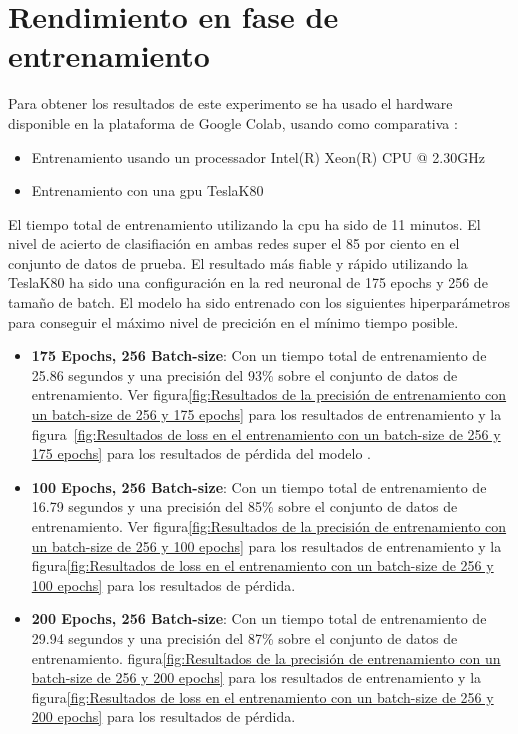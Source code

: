\section{Rendimiento en fase de entrenamiento}\label{sec:rendimiento-en-fase-de-entrenamiento}
Para obtener los resultados de este experimento se ha usado el hardware disponible en la plataforma de Google Colab, usando como comparativa :
\begin{itemize}
    \item Entrenamiento usando un processador Intel(R) Xeon(R) CPU @ 2.30GHz
    \item Entrenamiento con una gpu TeslaK80
\end{itemize}

El tiempo total de entrenamiento utilizando la cpu ha sido de 11 minutos.
El nivel de acierto de clasifiación en ambas redes super el 85 por ciento en el conjunto de datos de prueba.
El resultado más fiable y rápido utilizando la TeslaK80 ha sido una configuración en la red neuronal de 175 epochs y 256 de tamaño de batch.
El modelo ha sido entrenado con los siguientes hiperparámetros para conseguir el máximo nivel de precición en el mínimo tiempo posible.
\begin{itemize}
    \item \textbf{175 Epochs, 256 Batch-size}: Con un tiempo total de entrenamiento de 25.86 segundos y una precisión del 93\% sobre el conjunto de datos de entrenamiento.
    Ver figura\ref{fig:Resultados de la precisión de entrenamiento con un batch-size de 256 y 175 epochs} para los resultados de entrenamiento y la figura~\ref{fig:Resultados de loss en el entrenamiento con un batch-size de 256 y 175 epochs} para los resultados de pérdida del modelo .
    \item \textbf{100 Epochs, 256 Batch-size}: Con un tiempo total de entrenamiento de 16.79 segundos y una precisión del 85\% sobre el conjunto de datos de entrenamiento.
    Ver figura\ref{fig:Resultados de la precisión de entrenamiento con un batch-size de 256 y 100 epochs} para los resultados de entrenamiento y la figura\ref{fig:Resultados de loss en el entrenamiento con un batch-size de 256 y 100 epochs} para los resultados de pérdida.
    \item \textbf{200 Epochs, 256 Batch-size}: Con un tiempo total de entrenamiento de 29.94 segundos y una precisión del 87\% sobre el conjunto de datos de entrenamiento.
    \Ver figura\ref{fig:Resultados de la precisión de entrenamiento con un batch-size de 256 y 200 epochs} para los resultados de entrenamiento y la figura\ref{fig:Resultados de loss en el entrenamiento con un batch-size de 256 y 200 epochs} para los resultados de pérdida.
\end{itemize}

